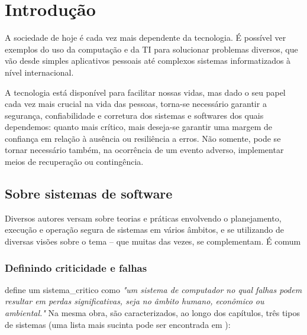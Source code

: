 
\chapter[Introdução]{Introdução}

A sociedade de hoje é cada vez mais dependente da tecnologia. É possível ver 
exemplos do uso da computação e da \gls{TI} para solucionar problemas diversos, 
que vão desde simples aplicativos pessoais até complexos sistemas 
informatizados à nível internacional.

A tecnologia está disponível para facilitar nossas vidas, mas dado o seu papel 
cada vez mais crucial na vida das pessoas, torna-se necessário garantir a 
segurança, confiabilidade e corretura dos sistemas e softwares dos quais 
dependemos: quanto mais crítico, mais deseja-se garantir uma margem de 
confiança em relação à ausência ou resiliência a erros. Não 
somente, pode se tornar necessário também, na ocorrência de um evento adverso, 
implementar meios de recuperação ou contingência.

\section{Sobre sistemas de software}

    Diversos autores versam sobre teorias e práticas envolvendo o planejamento, 
    execução e operação segura de sistemas em vários âmbitos, e se utilizando 
    de diversas visões sobre o tema -- que muitas das vezes, se complementam. É 
    comum 

    \subsection{Definindo criticidade e falhas} 
    \label{introducao_sobre_criticidade}

     define um \gls{sistema_critico} como 
    \emph{"um sistema de computador no qual falhas podem resultar em perdas 
    significativas, seja no âmbito humano, econômico ou ambiental."} Na mesma 
    obra, são caracterizados, ao longo dos capítulos, três tipos de sistemas 
    (uma lista mais sucinta pode ser encontrada em 
    \cite{sommerville_critical_2008}):
    
